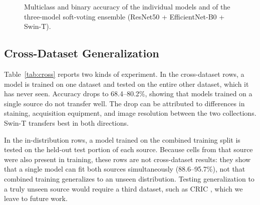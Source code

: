 \documentclass[runningheads]{llncs}
\begin{document}
\begin{figure}[t]
\centering
{}
\caption{Multiclass and binary accuracy of the individual models and of the three-model soft-voting ensemble (ResNet50 + EfficientNet-B0 + Swin-T).}
\label{fig:accbar}
\end{figure}

\subsection{Cross-Dataset Generalization}
\label{sec:cross}

Table~\ref{tab:cross} reports two kinds of experiment. In the cross-dataset rows, a model is trained on one dataset and tested on the entire other dataset, which it has never seen. Accuracy drops to 68.4--80.2\%, showing that models trained on a single source do not transfer well. The drop can be attributed to differences in staining, acquisition equipment, and image resolution between the two collections. Swin-T transfers best in both directions.

In the in-distribution rows, a model trained on the combined training split is tested on the held-out test portion of each source. Because cells from that source were also present in training, these rows are not cross-dataset results: they show that a single model can fit both sources simultaneously (88.6--95.7\%), not that combined training generalizes to an unseen distribution. Testing generalization to a truly unseen source would require a third dataset, such as CRIC \cite{rezende2021cric}, which we leave to future work.
\end{document}
